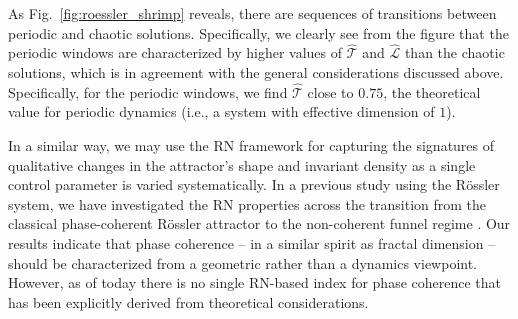 \documentclass[graybox]{svmult}
\begin{document}
As Fig.~\ref{fig:roessler_shrimp} reveals, there are sequences of transitions between periodic and chaotic solutions. Specifically, we clearly see from the figure that the periodic windows are characterized by higher values of $\hat{\mathcal{T}}$ and $\hat{\mathcal{L}}$ than the chaotic solutions, which is in agreement with the general considerations discussed above. Specifically, for the periodic windows, we find $\hat{\mathcal{T}}$ close to $0.75$, the theoretical value for periodic dynamics (i.e., a system with effective dimension of $1$).

In a similar way, we may use the RN framework for capturing the signatures of qualitative changes in the attractor's shape and invariant density as a single control parameter is varied systematically. In a previous study using the R\"ossler system, we have investigated the RN properties across the transition from the classical phase-coherent R\"ossler attractor to the non-coherent funnel regime \cite{Zou2012aChaos}. Our results indicate that phase coherence -- in a similar spirit as fractal dimension -- should be characterized from a geometric rather than a dynamics viewpoint. However, as of today there is no single RN-based index for phase coherence that has been explicitly derived from theoretical considerations.

\end{document}
